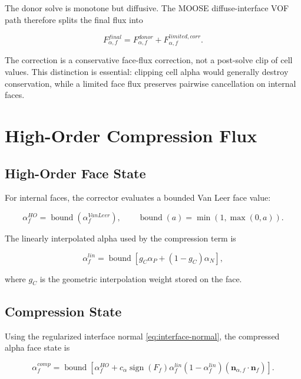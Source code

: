 \documentclass[11pt]{article}
\newcommand{\bnd}{\operatorname{bound}}
\newcommand{\sign}{\operatorname{sign}}
\begin{document}
The donor solve is monotone but diffusive.  The MOOSE diffuse-interface VOF path
therefore splits the final flux into

\begin{equation}
  F_{\alpha,f}^{final}
  =
  F_{\alpha,f}^{donor}
  +
  F_{\alpha,f}^{limited,corr}.
  \label{eq:flux-split}
\end{equation}

The correction is a conservative face-flux correction, not a post-solve clip of
cell values.  This distinction is essential: clipping cell alpha would generally
destroy conservation, while a limited face flux preserves pairwise cancellation
on internal faces.

\section{High-Order Compression Flux}

\subsection{High-Order Face State}

For internal faces, the corrector evaluates a bounded Van Leer face value:

\begin{equation}
  \alpha_f^{HO}
  =
  \bnd\left(\alpha_f^{VanLeer}\right),
  \qquad
  \bnd(a)=\min(1,\max(0,a)).
\end{equation}

The linearly interpolated alpha used by the compression term is

\begin{equation}
  \alpha_f^{lin}
  =
  \bnd
  \left[
    g_C\alpha_P+(1-g_C)\alpha_N
  \right],
  \label{eq:linear-alpha-face}
\end{equation}

where \(g_C\) is the geometric interpolation weight stored on the face.

\subsection{Compression State}

Using the regularized interface normal \eqref{eq:interface-normal}, the
compressed alpha face state is

\begin{equation}
  \alpha_f^{comp}
  =
  \bnd
  \left[
    \alpha_f^{HO}
    +
    c_\alpha
    \sign(F_f)
    \alpha_f^{lin}(1-\alpha_f^{lin})
    \left(\mathbf{n}_{\alpha,f}\cdot\mathbf{n}_f\right)
  \right].
  \label{eq:compressed-alpha}
\end{equation}
\end{document}
